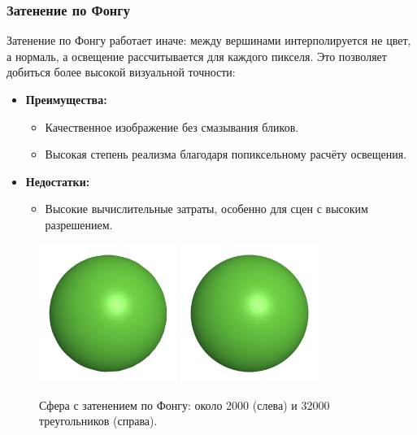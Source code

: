 \subsubsection{Затенение по Фонгу}

\hspace{1.25cm}
Затенение по Фонгу работает иначе: между вершинами интерполируется не цвет, а нормаль, а освещение рассчитывается для каждого пикселя. Это позволяет добиться более высокой визуальной точности:

\begin{itemize}
    \item \textbf{Преимущества:}
    \begin{itemize}
        \item Качественное изображение без смазывания бликов.
        \item Высокая степень реализма благодаря попиксельному расчёту освещения.
    \end{itemize}
    \item \textbf{Недостатки:}
    \begin{itemize}
        \item Высокие вычислительные затраты, особенно для сцен с высоким разрешением.
    \end{itemize}
\end{itemize}

\begin{figure}[h!]
    \centering
    \includegraphics[width=0.4\textwidth]{img/phong1.png}
    \includegraphics[width=0.4\textwidth]{img/phong2.png}
    \caption{Сфера с затенением по Фонгу: около 2000 (слева) и 32000 треугольников (справа).}
\end{figure}

